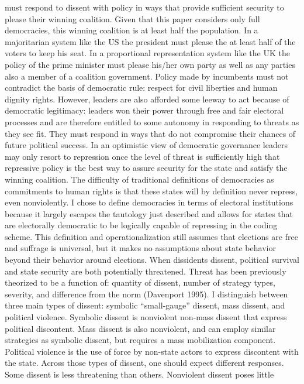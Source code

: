 \documentclass[ignorenonframetext,]{beamer}
\begin{document}
\begin{frame}[fragile]
must respond to dissent with policy in ways that provide sufficient
security to please their winning coalition. Given that this paper
considers only full democracies, this winning coalition is at least half
the population. In a majoritarian system like the US the president must
please the at least half of the voters to keep his seat. In a
proportional representation system like the UK the policy of the prime
minister must please his/her own party as well as any parties also a
member of a coalition government. Policy made by incumbents must not
contradict the basis of democratic rule: respect for civil liberties and
human dignity rights. However, leaders are also afforded some leeway to
act because of democratic legitimacy: leaders won their power through
free and fair electoral processes and are therefore entitled to some
autonomy in responding to threats as they see fit. They must respond in
ways that do not compromise their chances of future political success.
In an optimistic view of democratic governance leaders may only resort
to repression once the level of threat is sufficiently high that
repressive policy is the best way to assure security for the state and
satisfy the winning coalition. The difficulty of traditional definitions
of democracies as commitments to human rights is that these states will
by definition never repress, even nonviolently. I chose to define
democracies in terms of electoral institutions because it largely
escapes the tautology just described and allows for states that are
electorally democratic to be logically capable of repressing in the
coding scheme. This definition and operationalization still assumes that
elections are free and suffrage is universal, but it makes no
assumptions about state behavior beyond their behavior around elections.
When dissidents dissent, political survival and state security are both
potentially threatened. Threat has been previously theorized to be a
function of: quantity of dissent, number of strategy types, severity,
and difference from the norm (Davenport 1995). I distinguish between
three main types of dissent: symbolic ``small-gauge'' dissent, mass
dissent, and political violence. Symbolic dissent is nonviolent non-mass
dissent that express political discontent. Mass dissent is also
nonviolent, and can employ similar strategies as symbolic dissent, but
requires a mass mobilization component. Political violence is the use of
force by non-state actors to express discontent with the state. Across
those types of dissent, one should expect different responses. Some
dissent is less threatening than others. Nonviolent dissent poses little

\end{frame}
\end{document}
